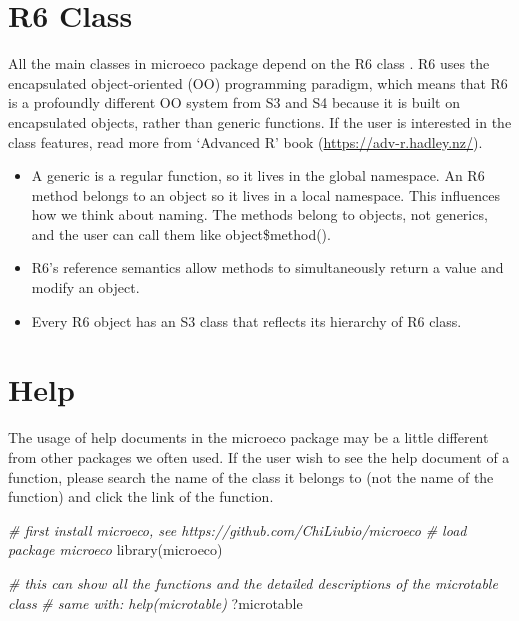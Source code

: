 \documentclass[
]{book}
\newenvironment{Shaded}{\begin{snugshade}}{\end{snugshade}}
\newcommand{\CommentTok}[1]{\textcolor[rgb]{0.56,0.35,0.01}{\textit{#1}}}
\newcommand{\FunctionTok}[1]{\textcolor[rgb]{0.00,0.00,0.00}{#1}}
\newcommand{\NormalTok}[1]{#1}
\begin{document}
\hypertarget{r6-class}{%
\section{R6 Class}\label{r6-class}}

All the main classes in microeco package depend on the R6 class \citep{R6_Winston}.
R6 uses the encapsulated object-oriented (OO) programming paradigm,
which means that R6 is a profoundly different OO system from S3 and S4 because it is built on encapsulated objects, rather than generic functions.
If the user is interested in the class features, read more from `Advanced R' book (\url{https://adv-r.hadley.nz/}).

\begin{itemize}
\item
  A generic is a regular function, so it lives in the global namespace. An R6 method belongs to an object so it lives in a local namespace.
  This influences how we think about naming. The methods belong to objects, not generics, and the user can call them like object\$method().
\item
  R6's reference semantics allow methods to simultaneously return a value and modify an object.
\item
  Every R6 object has an S3 class that reflects its hierarchy of R6 class.
\end{itemize}

\hypertarget{help}{%
\section{Help}\label{help}}

The usage of help documents in the microeco package may be a little different from other packages we often used.
If the user wish to see the help document of a function, please search the name of the class it belongs to (not the name of the function)
and click the link of the function.

\begin{Shaded}
\begin{Highlighting}[]
\CommentTok{\# first install microeco, see https://github.com/ChiLiubio/microeco}
\CommentTok{\# load package microeco}
\FunctionTok{library}\NormalTok{(microeco)}
\end{Highlighting}
\end{Shaded}

\begin{Shaded}
\begin{Highlighting}[]
\CommentTok{\# this can show all the functions and the detailed descriptions of the microtable class}
\CommentTok{\# same with: help(microtable)}
\NormalTok{?microtable}
\end{Highlighting}
\end{Shaded}
\end{document}
